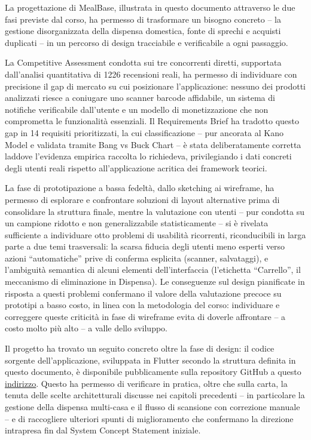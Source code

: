 \documentclass[11pt,a4paper]{article}
\begin{document}
La progettazione di MealBase, illustrata in questo documento attraverso le due fasi previste dal corso, ha permesso di trasformare un bisogno concreto -- la gestione disorganizzata della dispensa domestica, fonte di sprechi e acquisti duplicati -- in un percorso di design tracciabile e verificabile a ogni passaggio.

La Competitive Assessment condotta sui tre concorrenti diretti, supportata dall'analisi quantitativa di 1226 recensioni reali, ha permesso di individuare con precisione il gap di mercato su cui posizionare l'applicazione: nessuno dei prodotti analizzati riesce a coniugare uno scanner barcode affidabile, un sistema di notifiche verificabile dall'utente e un modello di monetizzazione che non comprometta le funzionalità essenziali. Il Requirements Brief ha tradotto questo gap in 14 requisiti prioritizzati, la cui classificazione -- pur ancorata al Kano Model e validata tramite Bang vs Buck Chart -- è stata deliberatamente corretta laddove l'evidenza empirica raccolta lo richiedeva, privilegiando i dati concreti degli utenti reali rispetto all'applicazione acritica dei framework teorici.

La fase di prototipazione a bassa fedeltà, dallo sketching ai wireframe, ha permesso di esplorare e confrontare soluzioni di layout alternative prima di consolidare la struttura finale, mentre la valutazione con utenti -- pur condotta su un campione ridotto e non generalizzabile statisticamente -- si è rivelata sufficiente a individuare otto problemi di usabilità ricorrenti, riconducibili in larga parte a due temi trasversali: la scarsa fiducia degli utenti meno esperti verso azioni ``automatiche'' prive di conferma esplicita (scanner, salvataggi), e l'ambiguità semantica di alcuni elementi dell'interfaccia (l'etichetta ``Carrello'', il meccanismo di eliminazione in Dispensa). Le conseguenze sul design pianificate in risposta a questi problemi confermano il valore della valutazione precoce su prototipi a basso costo, in linea con la metodologia del corso: individuare e correggere queste criticità in fase di wireframe evita di doverle affrontare -- a costo molto più alto -- a valle dello sviluppo.

Il progetto ha trovato un seguito concreto oltre la fase di design: il codice sorgente dell'applicazione, sviluppata in Flutter secondo la struttura definita in questo documento, è disponibile pubblicamente sulla repository GitHub a questo \href{https://github.com/NadalMattia/mealbase/tree/master}{\uline{indirizzo}}. Questo ha permesso di verificare in pratica, oltre che sulla carta, la tenuta delle scelte architetturali discusse nei capitoli precedenti -- in particolare la gestione della dispensa multi-casa e il flusso di scansione con correzione manuale -- e di raccogliere ulteriori spunti di miglioramento che confermano la direzione intrapresa fin dal System Concept Statement iniziale.
\end{document}
